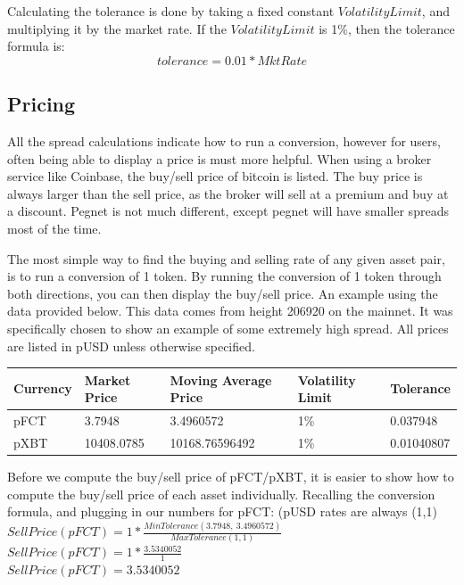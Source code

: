 \documentclass[12pt]{article}
\begin{document}
    Calculating the tolerance is done by taking a fixed constant $Volatility Limit$, and multiplying it by the market rate. If the $Volatility Limit$ is 1\%, then the tolerance formula is:
     \[ 
     tolerance = 0.01 * MktRate
    \]
  
  
\pagebreak
\subsection{Pricing}

    All the spread calculations indicate how to run a conversion, however for users, often being able to display a price is must more helpful. When using a broker service like Coinbase, the buy/sell price of bitcoin is listed. The buy price is always larger than the sell price, as the broker will sell at a premium and buy at a discount. Pegnet is not much different, except pegnet will have smaller spreads most of the time.
    
    The most simple way to find the buying and selling rate of any given asset pair, is to run a conversion of 1 token. By running the conversion of 1 token through both directions, you can then display the buy/sell price. An example using the data provided below. This data comes from height 206920 on the mainnet. It was specifically chosen to show an example of some extremely high spread. All prices are listed in pUSD unless otherwise specified.
    \\ 

    \begin{tabular}{|l|l|l|l|l|}
    \hline
    Currency & Market Price & Moving Average Price & Volatility Limit & Tolerance \\
    \hline \hline
    pFCT     & 3.7948       & 3.4960572            & 1\%               & 0.037948 \\
    \hline
    pXBT     & 10408.0785   & 10168.76596492       & 1\%               & 0.01040807 \\
    \hline
    \end{tabular}
    
    Before we compute the buy/sell price of pFCT/pXBT, it is easier to show how to compute the buy/sell price of each asset individually. Recalling the conversion formula, and plugging in our numbers for pFCT: (pUSD rates are always (1,1) \\[10pt]
    $SellPrice(pFCT) = 1 * \frac{MinTolerance(3.7948,\ 3.4960572)}{MaxTolerance(1, 1)}$ \\[4pt]
    $SellPrice(pFCT) = 1 * \frac{3.5340052}{1}$  \\[4pt]
    $SellPrice(pFCT) = 3.5340052$ \\ 
    
\end{document}
